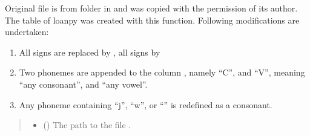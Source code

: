 \documentclass[letterpaper,10pt,english]{sphinxmanual}
\begin{document}

\begin{fulllineitems}
\label{\detokenize{documentation:loanpy.utils.modify_ipa_all}}
\pysigstartsignatures
{}
\pysigstopsignatures
\sphinxAtStartPar
Original file is  from folder  in 
and was copied with the permission of its author.
The  table of loanpy was created with this function.
Following modifications are undertaken:
\begin{enumerate}
%
\item {} 
\sphinxAtStartPar
All \sphinxcode{\sphinxupquote{+}} signs are replaced by , all \sphinxcode{\sphinxupquote{\sphinxhyphen{}}} signs by 

\item {} 
\sphinxAtStartPar
Two phonemes are appended to the column ,
namely “C”, and “V”, meaning “any consonant”, and “any vowel”.

\item {} 
\sphinxAtStartPar
Any phoneme containing “j”, “w”, or “” is redefined as a consonant.

\end{enumerate}
\begin{quote}\begin{description}
\begin{itemize}
\item {} 
\sphinxAtStartPar
{} () \textendash{} The path to the file .


\end{itemize}
\end{description}
\end{quote}
\end{fulllineitems}
\end{document}
